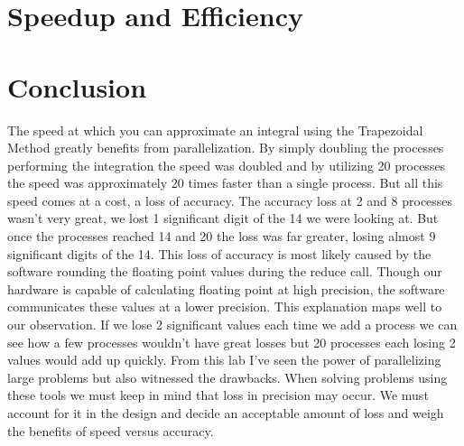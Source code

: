 \documentclass[table]{report}
\begin{document}
\section{Speedup and Efficiency}

\begin{figure}[H]
\centering
	\label{fig:speedup}
\end{figure}

\begin{figure}[H]
\centering
	\label{fig:efficiency}
\end{figure}

\section{Conclusion}

The speed at which you can approximate an integral using the Trapezoidal
Method greatly benefits from parallelization. By simply doubling the 
processes performing the integration the speed was doubled and by utilizing
20 processes the speed was approximately 20 times faster than a single
process. But all this speed comes at a cost, a loss of accuracy. The 
accuracy loss at 2 and 8 processes wasn't very great, we lost 1 significant
digit of the 14 we were looking at. But once the processes reached 14 and
20 the loss was far greater, losing almost 9 significant digits of the 14.
This loss of accuracy is most likely caused by the software rounding the
floating point values during the reduce call. Though our hardware is capable
of calculating floating point at high precision, the software communicates
these values at a lower precision. This explanation maps well to our 
observation. If we lose 2 significant values each time we add a process 
we can see how a few processes wouldn't have great losses but 20 processes 
each losing 2 values would add up quickly. From this lab I've seen the power
of parallelizing large problems but also witnessed the drawbacks. When 
solving problems using these tools we must keep in mind that loss in 
precision may occur. We must account for it in the design and decide
an acceptable amount of loss and weigh the benefits of speed versus accuracy.
\end{document}
